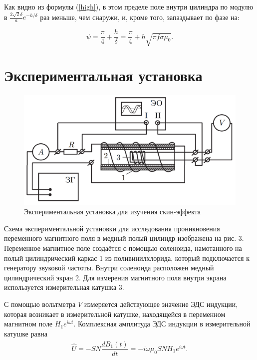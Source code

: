	\newpage
	
	Как видно из формулы (\ref{high}), в этом пределе поле внутри цилиндра по модулю в $\frac{2\sqrt{2}\delta}{a}e^{-h/\delta}$ раз меньше, чем снаружи, и, кроме того, запаздывает по фазе на:
	
	\begin{equation}
		\psi = \frac{\pi}{4} + \frac{h}{\delta} = \frac{\pi}{4} + h\sqrt{\pi f \sigma\mu_0}.
		\label{freq}
	\end{equation}
	
	\vspace{60mm}
	\section*{Экспериментальная установка}
	\begin{figure}[h!]
		\centering
		\includegraphics[scale=0.5]{images/Scheme.png}
		\caption{Экспериментальная установка для изучения скин-эффекта}
	\end{figure}

	Схема экспериментальной установки для исследования проникновения переменного магнитного поля в медный полый цилиндр изображена на рис. 3. Переменное магнитное поле создаётся с помощью соленоида, намотанного на полый цилиндрический каркас 1 из поливинилхлорида, который подключается к генератору звуковой частоты. Внутри соленоида расположен медный цилиндрический экран 2. Для измерения магнитного поля внутри экрана используется измерительная катушка 3.
	
	С помощью вольтметра $V$ измеряется действующее значение ЭДС индукции, которая возникает в измерительной катушке, находящейся в переменном магнитном поле $H_1 e^{i\omega t}$. Комплексная амплитуда ЭДС индукции в измерительной катушке равна 
	\begin{equation*}
		\widehat{U} = -SN \frac{d\widehat{B_1}(t)}{dt} = -i\omega\mu_0 SN H_1 e^{i\omega t}.
	\end{equation*}
	
